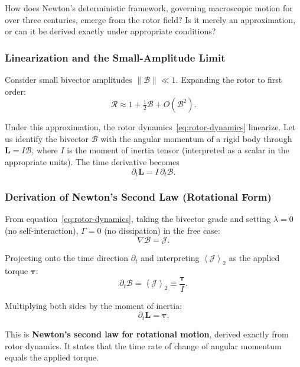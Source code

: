 \documentclass[11pt,a4paper]{article}
\newcommand{\grade}[2]{\left\langle #1 \right\rangle_{#2}}
\newcommand{\biv}[1]{\grade{#1}{2}}
\newcommand{\Rotor}{\mathcal{R}}
\newcommand{\Biv}{\mathcal{B}}
\newcommand{\D}{\nabla}                        %
\theoremstyle{definition}
\theoremstyle{plain}
\theoremstyle{remark}
\begin{document}
How does Newton's deterministic framework, governing macroscopic motion for over three centuries, emerge from the rotor field? Is it merely an approximation, or can it be derived exactly under appropriate conditions?

\subsubsection{Linearization and the Small-Amplitude Limit}

Consider small bivector amplitudes $\|\Biv\| \ll 1$. Expanding the rotor to first order:
\begin{equation}
\Rotor \approx 1 + \tfrac{1}{2}\Biv + O(\Biv^2).
\end{equation}

Under this approximation, the rotor dynamics~\eqref{eq:rotor-dynamics} linearize. Let us identify the bivector $\Biv$ with the angular momentum of a rigid body through $\bm{L} = I\Biv$, where $I$ is the moment of inertia tensor (interpreted as a scalar in the appropriate units). The time derivative becomes
\begin{equation}
\partial_t \bm{L} = I\, \partial_t \Biv.
\end{equation}

\subsubsection{Derivation of Newton's Second Law (Rotational Form)}

From equation~\eqref{eq:rotor-dynamics}, taking the bivector grade and setting $\lambda=0$ (no self-interaction), $\Gamma=0$ (no dissipation) in the free case:
\begin{equation}
\D \Biv = \mathcal{J}.
\end{equation}

Projecting onto the time direction $\partial_t$ and interpreting $\biv{\mathcal{J}}$ as the applied torque $\bm{\tau}$:
\begin{equation}
\partial_t \Biv = \biv{\mathcal{J}} \equiv \frac{\bm{\tau}}{I}.
\end{equation}

Multiplying both sides by the moment of inertia:
\begin{equation}
\partial_t \bm{L} = \bm{\tau}.
\label{eq:newton-rotational}
\end{equation}

This is \textbf{Newton's second law for rotational motion}, derived exactly from rotor dynamics. It states that the time rate of change of angular momentum equals the applied torque.
\end{document}

